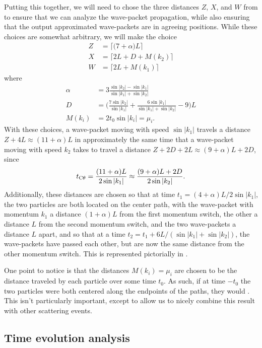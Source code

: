\documentclass[../thesis-main/thesis-main]{subfiles}
\begin{document}
Putting this together, we will need to chose the three distances $Z$, $X$, and $W$ from  to ensure that we can analyze the wave-packet propagation, while also ensuring that the output approximated wave-packets are in agreeing positions.  While these choices are somewhat arbitrary, we will make the choice
\begin{align}
  Z & = \lceil \big(7 + \alpha\big) L\rceil \label{eq:Z_eq} \\
  X & = \lceil 2L + D+M(k_2) \rceil \label{eq:X_eq}\\
  W & = \lceil 2L + M(k_1)\rceil \label{eq:W_eq}
\end{align}
where
\begin{align}
  \alpha &= 3 \frac{ \sin |k_2| - \sin |k_1|}{\sin |k_1| + \sin |k_2|}\\
  D &= \bigg(\frac{7\sin |k_2|}{\sin |k_1|} + \frac{6 \sin |k_1|}{\sin |k_1| + \sin |k_2|} - 9 \bigg)L \\
  M(k_i) & = 2 t_0 \sin |k_i| = \mu_i.
\end{align}
With these choices, a wave-packet moving with speed $\sin |k_1|$ travels a distance $Z+4L\approx(11+ \alpha)L$ in approximately the same time that a wave-packet moving with speed $k_2$ takes to travel a distance $Z+2D + 2L\approx(9+\alpha)L+2D$, since
\begin{align}
  t_{\mathrm{C}\theta}=\frac{(11 +  \alpha)L}{2 \sin |k_1|} \approx\frac{(9 + \alpha)L + 2 D}{2\sin |k_2|}.
  \label{eq:tcd_defn}
\end{align}
Additionally, these distances are chosen so that at time $t_1 = (4 + \alpha)L/2\sin |k_1|$, the two particles are both located on the center path, with the wave-packet with momentum $k_1$ a distance $(1 + \alpha)L$ from the first momentum switch, the other a distance $L$ from the second momentum switch, and the two wave-packets a distance $L$ apart, and so that at a time $t_2 = t_1 + 6L/(\sin |k_1| + \sin |k_2|)$, the wave-packets have passed each other, but are now the same distance from the other momentum switch.  This is represented pictorially in .

One point to notice is that the distances $M(k_i) = \mu_i$ are chosen to be the distance traveled by each particle over some time $t_0$.  As such, if at time $-t_0$ the two particles were both centered along the endpoints of the paths, they would .  This isn't particularly important, except to allow us to nicely combine this result with other scattering events.

\subsection{Time evolution analysis}
\end{document}
